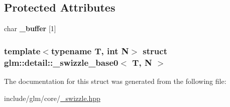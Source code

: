 \subsection*{\-Protected \-Attributes}
\begin{DoxyCompactItemize}
\item 
\hypertarget{structglm_1_1detail_1_1__swizzle__base0_afd4b7f15c9acff4cdef808f559ffec2d}{char {\bfseries \-\_\-buffer} \mbox{[}1\mbox{]}}\label{structglm_1_1detail_1_1__swizzle__base0_afd4b7f15c9acff4cdef808f559ffec2d}

\end{DoxyCompactItemize}
\subsubsection*{template$<$typename \-T, int \-N$>$ struct glm\-::detail\-::\-\_\-swizzle\-\_\-base0$<$ T, N $>$}



\-The documentation for this struct was generated from the following file\-:\begin{DoxyCompactItemize}
\item 
include/glm/core/\hyperlink{__swizzle_8hpp}{\-\_\-swizzle.\-hpp}\end{DoxyCompactItemize}
